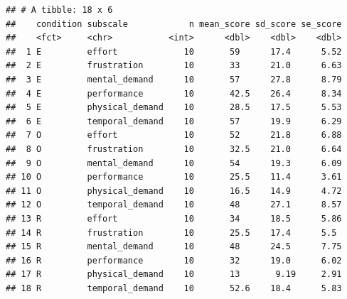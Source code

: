 \documentclass[
]{article}
\begin{document}
\begin{verbatim}
## # A tibble: 18 x 6
##    condition subscale            n mean_score sd_score se_score
##    <fct>     <chr>           <int>      <dbl>    <dbl>    <dbl>
##  1 E         effort             10       59      17.4      5.52
##  2 E         frustration        10       33      21.0      6.63
##  3 E         mental_demand      10       57      27.8      8.79
##  4 E         performance        10       42.5    26.4      8.34
##  5 E         physical_demand    10       28.5    17.5      5.53
##  6 E         temporal_demand    10       57      19.9      6.29
##  7 O         effort             10       52      21.8      6.88
##  8 O         frustration        10       32.5    21.0      6.64
##  9 O         mental_demand      10       54      19.3      6.09
## 10 O         performance        10       25.5    11.4      3.61
## 11 O         physical_demand    10       16.5    14.9      4.72
## 12 O         temporal_demand    10       48      27.1      8.57
## 13 R         effort             10       34      18.5      5.86
## 14 R         frustration        10       25.5    17.4      5.5 
## 15 R         mental_demand      10       48      24.5      7.75
## 16 R         performance        10       32      19.0      6.02
## 17 R         physical_demand    10       13       9.19     2.91
## 18 R         temporal_demand    10       52.6    18.4      5.83
\end{verbatim}
\end{document}
